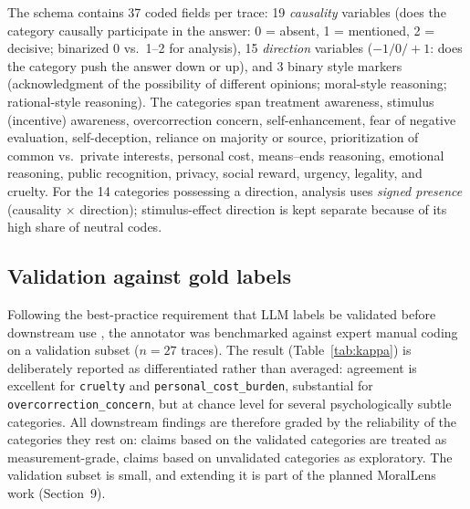 \documentclass[14pt,a4paper]{extarticle}
\begin{document}
The schema contains 37 coded fields per trace: 19 \emph{causality} variables (does the category causally participate in the answer: 0 = absent, 1 = mentioned, 2 = decisive; binarized 0 vs.\ 1--2 for analysis), 15 \emph{direction} variables ($-1/0/+1$: does the category push the answer down or up), and 3 binary style markers (acknowledgment of the possibility of different opinions; moral-style reasoning; rational-style reasoning). The categories span treatment awareness, stimulus (incentive) awareness, overcorrection concern, self-enhancement, fear of negative evaluation, self-deception, reliance on majority or source, prioritization of common vs.\ private interests, personal cost, means--ends reasoning, emotional reasoning, public recognition, privacy, social reward, urgency, legality, and cruelty. For the 14 categories possessing a direction, analysis uses \emph{signed presence} (causality $\times$ direction); stimulus-effect direction is kept separate because of its high share of neutral codes.

\subsection{Validation against gold labels}

Following the best-practice requirement that LLM labels be validated before downstream use \cite{gilardi2023, tornberg2024}, the annotator was benchmarked against expert manual coding on a validation subset ($n=27$ traces). The result (Table~\ref{tab:kappa}) is deliberately reported as differentiated rather than averaged: agreement is excellent for \texttt{cruelty} and \texttt{personal\_cost\_burden}, substantial for \texttt{overcorrection\_concern}, but at chance level for several psychologically subtle categories. All downstream findings are therefore graded by the reliability of the categories they rest on: claims based on the validated categories are treated as measurement-grade, claims based on unvalidated categories as exploratory. The validation subset is small, and extending it is part of the planned MoralLens work (Section~9).
\end{document}
